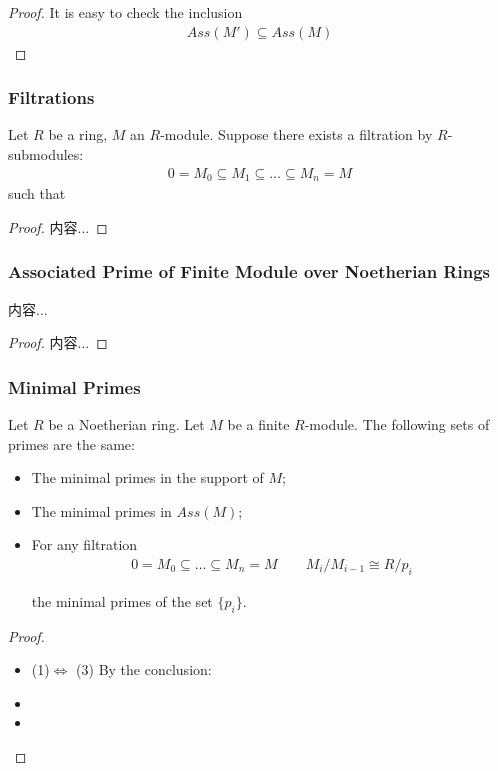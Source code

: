 \documentclass[Total.tex]{subfiles}
\begin{document}
			\begin{proof}
				It is easy to check the inclusion
				\begin{gather*}
					Ass(M')\subseteq Ass(M)
				\end{gather*}
				
			\end{proof}
			
			\subsubsection{Filtrations}
			\begin{lemma}
				Let $R$ be a ring, $M$ an $R$-module. Suppose there exists a filtration by $R$-submodules:
				\begin{gather*}
					0=M_0\subseteq M_1\subseteq\dots\subseteq M_n=M
				\end{gather*}
				such that 
			\end{lemma}
			\begin{proof}
				内容...
			\end{proof}
			\subsubsection{Associated Prime of Finite Module over Noetherian Rings}
			\begin{lemma}
				内容...
			\end{lemma}
			\begin{proof}
				内容...
			\end{proof}
			\subsubsection{Minimal Primes}
			\begin{proposition}
				Let $R$ be a Noetherian ring. Let $M$ be a finite $R$-module. The following sets of primes are the same:
				\begin{itemize}
					\item The minimal primes in the support of $M$;
					\item The minimal primes in $Ass(M)$;
					\item For any filtration 
					\begin{gather*}
						0=M_0\subseteq \dots\subseteq M_n=M\qquad M_i/M_{i-1}\cong R/p_i
					\end{gather*}
					
					the minimal primes of the set $\{p_i\}$.
				\end{itemize}
			\end{proposition}
			\begin{proof}
				\begin{itemize}
					\item (1)$\Leftrightarrow$ (3) By the conclusion: 
					
					\item 
					\item 
				\end{itemize}
			\end{proof}
			
\end{document}
